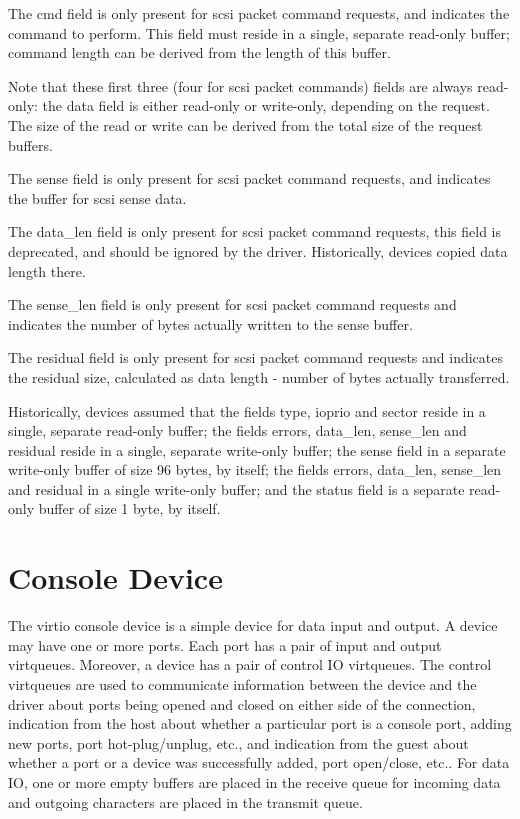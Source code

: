 The cmd field is only present for scsi packet command requests,
and indicates the command to perform. This field must reside in a
single, separate read-only buffer; command length can be derived
from the length of this buffer.

Note that these first three (four for scsi packet commands)
fields are always read-only: the data field is either read-only
or write-only, depending on the request. The size of the read or
write can be derived from the total size of the request buffers.

The sense field is only present for scsi packet command requests,
and indicates the buffer for scsi sense data.

The data_len field is only present for scsi packet command
requests, this field is deprecated, and should be ignored by the
driver. Historically, devices copied data length there.

The sense_len field is only present for scsi packet command
requests and indicates the number of bytes actually written to
the sense buffer.

The residual field is only present for scsi packet command
requests and indicates the residual size, calculated as data
length - number of bytes actually transferred.

Historically, devices assumed that the fields type, ioprio and
sector reside in a single, separate read-only buffer; the fields
errors, data_len, sense_len and residual reside in a single,
separate write-only buffer; the sense field in a separate
write-only buffer of size 96 bytes, by itself; the fields errors,
data_len, sense_len and residual in a single write-only buffer;
and the status field is a separate read-only buffer of size 1
byte, by itself.


\section{Console Device}\label{sec:Device Types / Console Device}

The virtio console device is a simple device for data input and
output. A device may have one or more ports. Each port has a pair
of input and output virtqueues. Moreover, a device has a pair of
control IO virtqueues. The control virtqueues are used to
communicate information between the device and the driver about
ports being opened and closed on either side of the connection,
indication from the host about whether a particular port is a
console port, adding new ports, port hot-plug/unplug, etc., and
indication from the guest about whether a port or a device was
successfully added, port open/close, etc.. For data IO, one or
more empty buffers are placed in the receive queue for incoming
data and outgoing characters are placed in the transmit queue.

